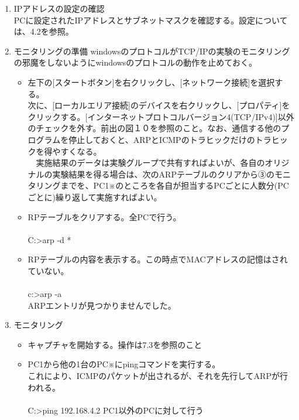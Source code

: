 \documentclass[10pt]{article}
\begin{document}
\begin{enumerate}
    \item IPアドレスの設定の確認 \\
        PCに設定されたIPアドレスとサブネットマスクを確認する。設定については、4.2を参照。
    \item モニタリングの準備
        windowsのプロトコルがTCP/IPの実験のモニタリングの邪魔をしないようにwindowsのプロトコルの動作を止めておく。
    \begin{itemize}
        \item 左下の[スタートボタン]を右クリックし、[ネットワーク接続]を選択する。\\
            次に、[ローカルエリア接続]のデバイスを右クリックし、[プロパティ]をクリックする。[インターネットプロトコルバージョン4(TCP/IPv4)]以外のチェックを外す。前出の図１０を参照のこと。なお、通信する他のプログラムを停止しておくと、ARPとICMPのトラヒックだけのトラヒックを得やすくなる。\\ 　実施結果のデータは実験グループで共有すればよいが、各自のオリジナルの実験結果を得る場合は、次のARPテーブルのクリアから③のモニタリングまでを、PC1※のところを各自が担当するPCごとに人数分(PCごとに)繰り返して実施すればよい。
        \item RPテーブルをクリアする。全PCで行う。\\\\
            C:>arp -d * \\
        \item RPテーブルの内容を表示する。この時点でMACアドレスの記憶はされていない。\\\\
        c:>arp -a \\
        ARPエントリが見つかりませんでした。 
    \end{itemize}
    
    \item  モニタリング
        \begin{itemize}
            \item キャプチャを開始する。操作は7.3を参照のこと
            \item PC1から他の1台のPC※にpingコマンドを実行する。\\
            これにより、ICMPのパケットが出されるが、それを先行してARPが行われる。\\\\
                C:>ping 192.168.4.2  \text{*}PC1以外のPCに対して行う \\
        

\end{itemize}
\end{enumerate}
\end{document}
